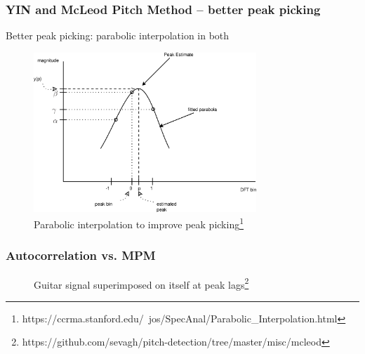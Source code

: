 \documentclass{beamer}
\begin{document}

\begin{frame}
	\frametitle{YIN and McLeod Pitch Method -- better peak picking}
	Better peak picking: parabolic interpolation in both
	\begin{figure}
		\includegraphics[height=6cm]{./parabolicinterp.png}
		\caption{Parabolic interpolation to improve peak picking\footnote{https://ccrma.stanford.edu/~jos/SpecAnal/Parabolic\_Interpolation.html}}
	\end{figure}
\end{frame}

\begin{frame}
	\frametitle{Autocorrelation vs. MPM}
	\begin{figure}
		\hspace{0.1em}
		\caption{Guitar signal superimposed on itself at peak lags\footnote{https://github.com/sevagh/pitch-detection/tree/master/misc/mcleod}}
	\end{figure}
\end{frame}
\end{document}
